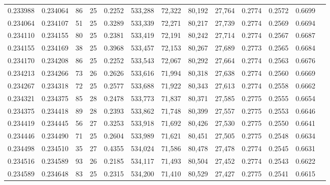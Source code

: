 \begin{tabular}{rrrrrrrrrrrrr}
0.233988 & 0.234064 &  86 &  25 &                                     0.2252 & 533,288 &  72,322 &  80,192 &  27,764 & 0.2774 & 0.2572 & 0.6699 \\
0.234064 & 0.234107 &  51 &  25 &                                     0.3289 & 533,339 &  72,271 &  80,217 &  27,739 & 0.2774 & 0.2569 & 0.6694 \\
0.234110 & 0.234155 &  80 &  25 &                                     0.2381 & 533,419 &  72,191 &  80,242 &  27,714 & 0.2774 & 0.2567 & 0.6687 \\
0.234155 & 0.234169 &  38 &  25 &                                     0.3968 & 533,457 &  72,153 &  80,267 &  27,689 & 0.2773 & 0.2565 & 0.6684 \\
0.234170 & 0.234208 &  86 &  25 &                                     0.2252 & 533,543 &  72,067 &  80,292 &  27,664 & 0.2774 & 0.2563 & 0.6676 \\
0.234213 & 0.234266 &  73 &  26 &                                     0.2626 & 533,616 &  71,994 &  80,318 &  27,638 & 0.2774 & 0.2560 & 0.6669 \\
0.234267 & 0.234318 &  72 &  25 &                                     0.2577 & 533,688 &  71,922 &  80,343 &  27,613 & 0.2774 & 0.2558 & 0.6662 \\
0.234321 & 0.234375 &  85 &  28 &                                     0.2478 & 533,773 &  71,837 &  80,371 &  27,585 & 0.2775 & 0.2555 & 0.6654 \\
0.234375 & 0.234418 &  89 &  28 &                                     0.2393 & 533,862 &  71,748 &  80,399 &  27,557 & 0.2775 & 0.2553 & 0.6646 \\
0.234419 & 0.234445 &  56 &  27 &                                     0.3253 & 533,918 &  71,692 &  80,426 &  27,530 & 0.2775 & 0.2550 & 0.6641 \\
0.234446 & 0.234490 &  71 &  25 &                                     0.2604 & 533,989 &  71,621 &  80,451 &  27,505 & 0.2775 & 0.2548 & 0.6634 \\
0.234498 & 0.234510 &  35 &  27 &                                     0.4355 & 534,024 &  71,586 &  80,478 &  27,478 & 0.2774 & 0.2545 & 0.6631 \\
0.234516 & 0.234589 &  93 &  26 &                                     0.2185 & 534,117 &  71,493 &  80,504 &  27,452 & 0.2774 & 0.2543 & 0.6622 \\
0.234589 & 0.234648 &  83 &  25 &                                     0.2315 & 534,200 &  71,410 &  80,529 &  27,427 & 0.2775 & 0.2541 & 0.6615 \\

\end{tabular}
